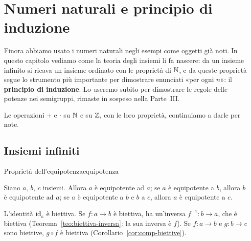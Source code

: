 \chapter{Numeri naturali e principio di induzione}\label{cap:induzione}

Finora abbiamo usato i numeri naturali negli esempi come oggetti già noti. In questo capitolo vediamo come la teoria degli
insiemi li fa nascere: da un insieme infinito si ricava un insieme ordinato con le proprietà di $\mathbb{N}$, e da queste proprietà
segue lo strumento più importante per dimostrare enunciati «per ogni $n$»: il \textbf{principio di induzione}. Lo useremo subito
per dimostrare le regole delle potenze nei semigruppi, rimaste in sospeso nella Parte~III.

Le operazioni $+$ e $\cdot$ su $\mathbb{N}$ e su $\mathbb{Z}$, con le loro proprietà, continuiamo a darle per note.

\section{Insiemi infiniti}\label{sec:infiniti}


\begin{concetto}
\begin{Proposizione}{Proprietà dell'equipotenza}{equipotenza}
    \begin{prerequisiti}
    \end{prerequisiti}
    Siano $a$, $b$, $c$ insiemi. Allora $a$ è equipotente ad $a$; se $a$ è equipotente a $b$, allora $b$ è equipotente ad $a$; se $a$ è
    equipotente a $b$ e $b$ a $c$, allora $a$ è equipotente a $c$.
\end{Proposizione}
\begin{dimostrazione}
    L'identità $\mathrm{id}_a$ è biettiva. Se $f \colon a \to b$ è biettiva, ha un'inversa $f^{-1} \colon b \to a$, che è biettiva
    (Teorema~\ref{teo:biettiva-inversa}: la sua inversa è $f$). Se $f \colon a \to b$ e $g \colon b \to c$ sono biettive, $g \circ f$
    è biettiva (Corollario~\ref{cor:comp-biettive}).
\end{dimostrazione}
\end{concetto}

